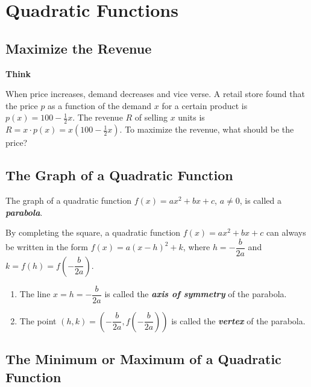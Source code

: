 \documentclass[en,12pt]{elegantbook}
\providecommand{\tightlist}{%
  \setlength{\itemsep}{0pt}\setlength{\parskip}{0pt}}
\newenvironment{rmdthink}{
	\par\noindent
	{
		\makebox[-\width][r]{
			\footnotesize
			\color{green!90}\faLightbulbO
			\hspace*{3pt}
		}
			\textbf{
				\color{second}
				Think 
			}
    }
    \begin{shaded}
    \sffamily
}{
    \par\medskip\ignorespacesafterend
    \end{shaded}
}
\providecommand{\tightlist}{%
  \setlength{\itemsep}{0pt}\setlength{\parskip}{0pt}}
\begin{document}
\hypertarget{quadratic-functions}{%
\chapter{Quadratic Functions}\label{quadratic-functions}}

\hypertarget{maximize-the-revenue}{%
\section{Maximize the Revenue}\label{maximize-the-revenue}}

\begin{rmdthink}

When price increases, demand decreases and vice verse. A retail store found that the price \(p\) as a function of the demand \(x\) for a certain product is \(p(x)=100-\frac12 x\). The revenue \(R\) of selling \(x\) units is \(R=x\cdot p(x)=x(100-\frac12x)\). To maximize the revenue, what should be the price?

\end{rmdthink}

\hypertarget{the-graph-of-a-quadratic-function}{%
\section{The Graph of a Quadratic Function}\label{the-graph-of-a-quadratic-function}}

The graph of a quadratic function \(f(x)=ax^2+bx+c\), \(a\neq 0\), is called a \textbf{\emph{parabola}}.

By completing the square, a quadratic function \(f(x)=ax^2+bx+c\) can always be written in the form \(f(x)=a(x-h)^2+k\), where \(h=-\dfrac{b}{2a}\) and \(k=f(h)=f\left(-\dfrac{b}{2a}\right)\).

\begin{enumerate}
\def\labelenumi{\arabic{enumi}.}
\tightlist
\item
  The line \(x=h=-\dfrac{b}{2a}\) is called the \textbf{\emph{axis of symmetry}} of the parabola.
\item
  The point \((h, k)=\left(-\dfrac{b}{2a}, f\left(-\dfrac{b}{2a}\right)\right)\) is called the \textbf{\emph{vertex}} of the parabola.
\end{enumerate}

\hypertarget{the-minimum-or-maximum-of-a-quadratic-function}{%
\section{The Minimum or Maximum of a Quadratic Function}\label{the-minimum-or-maximum-of-a-quadratic-function}}
\end{document}
